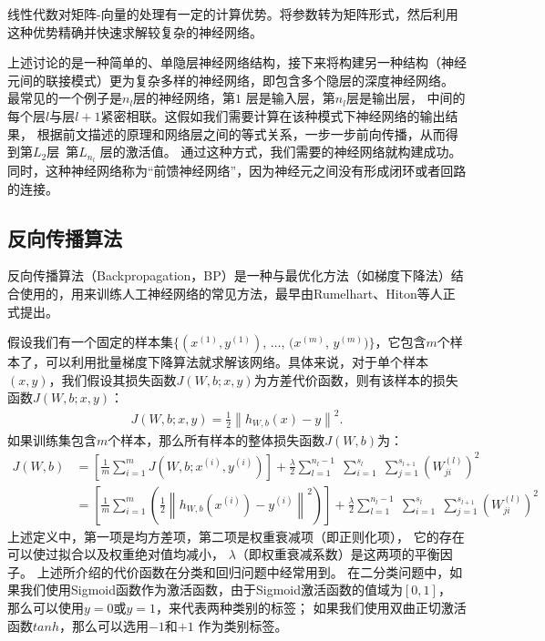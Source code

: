 线性代数对矩阵-向量的处理有一定的计算优势。将参数转为矩阵形式，然后利用这种优势精确并快速求解较复杂的神经网络。\par

上述讨论的是一种简单的、单隐层神经网络结构，接下来将构建另一种结构（神经元间的联接模式）更为复杂多样的神经网络，即包含多个隐层的深度神经网络。
最常见的一个例子是$n_l$层的神经网络，第$1$ 层是输入层，第$n_l$层是输出层，
中间的每个层$l$与层$l+1$紧密相联。这假如我们需要计算在该种模式下神经网络的输出结果，
根据前文描述的原理和网络层之间的等式关系，一步一步前向传播，从而得到第$L_2$层~第$L_{n_l}$ 层的激活值。
通过这种方式，我们需要的神经网络就构建成功。
同时，这种神经网络称为“前馈神经网络”，因为神经元之间没有形成闭环或者回路的连接。\par

\subsection{反向传播算法}
反向传播算法（Backpropagation，BP）是一种与最优化方法（如梯度下降法）结合使用的，用来训练人工神经网络的常见方法，最早由Rumelhart、Hiton等人正式提出\cite{rumelhart1986learning}。\par

假设我们有一个固定的样本集$\{ (x^{(1)}, y^{(1)})$, $\ldots$, $(x^{(m)}$, $y^{(m)}) \}$，它包含$m$个样本了，可以利用批量梯度下降算法就求解该网络。具体来说，对于单个样本$(x,y)$，我们假设其损失函数$J(W,b; x,y)$为方差代价函数，则有该样本的损失函数$J(W,b; x,y)$：
\begin{align}
	J(W,b; x,y) = \frac{1}{2} \left\| h_{W,b}(x) - y \right\|^2.
\end{align}
如果训练集包含$m$个样本，那么所有样本的整体损失函数$J(W,b)$为：
\begin{equation}
	\begin{aligned}
	J(W,b)
	&= \left[ \frac{1}{m} \sum_{i=1}^m J(W,b;x^{(i)},y^{(i)}) \right]
	+ \frac{\lambda}{2} \sum_{l=1}^{n_l-1} \; \sum_{i=1}^{s_l} \; \sum_{j=1}^{s_{l+1}} \left( W^{(l)}_{ji} \right)^2
	\\
	&= \left[ \frac{1}{m} \sum_{i=1}^m \left( \frac{1}{2} \left\| h_{W,b}(x^{(i)}) - y^{(i)} \right\|^2 \right) \right]
	+ \frac{\lambda}{2} \sum_{l=1}^{n_l-1} \; \sum_{i=1}^{s_l} \; \sum_{j=1}^{s_{l+1}} \left( W^{(l)}_{ji} \right)^2
	\end{aligned}
\end{equation}
上述定义中，第一项是均方差项，第二项是权重衰减项（即正则化项），
它的存在可以使过拟合以及权重绝对值均减小，
$\lambda$（即权重衰减系数）是这两项的平衡因子。
上述所介绍的代价函数在分类和回归问题中经常用到。
在二分类问题中，如果我们使用Sigmoid函数作为激活函数，由于Sigmoid激活函数的值域为$[0,1]$，
那么可以使用$y=0$或$y=1$，来代表两种类别的标签；
如果我们使用双曲正切激活函数$tanh$，那么可以选用$-1$和$+1$ 作为类别标签。\par

